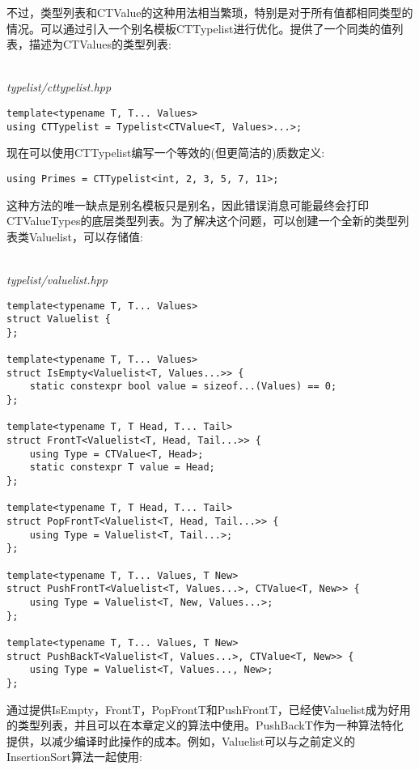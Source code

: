 不过，类型列表和CTValue的这种用法相当繁琐，特别是对于所有值都相同类型的情况。可以通过引入一个别名模板CTTypelist进行优化。提供了一个同类的值列表，描述为CTValues的类型列表:

\hspace*{\fill} \\ %
\noindent
\textit{typelist/cttypelist.hpp}
\begin{lstlisting}[style=styleCXX]
template<typename T, T... Values>
using CTTypelist = Typelist<CTValue<T, Values>...>;
\end{lstlisting}

现在可以使用CTTypelist编写一个等效的(但更简洁的)质数定义:

\begin{lstlisting}[style=styleCXX]
using Primes = CTTypelist<int, 2, 3, 5, 7, 11>;
\end{lstlisting}

这种方法的唯一缺点是别名模板只是别名，因此错误消息可能最终会打印CTValueTypes的底层类型列表。为了解决这个问题，可以创建一个全新的类型列表类Valuelist，可以存储值:

\hspace*{\fill} \\ %
\noindent
\textit{typelist/valuelist.hpp}
\begin{lstlisting}[style=styleCXX]
template<typename T, T... Values>
struct Valuelist {
};

template<typename T, T... Values>
struct IsEmpty<Valuelist<T, Values...>> {
	static constexpr bool value = sizeof...(Values) == 0;
};

template<typename T, T Head, T... Tail>
struct FrontT<Valuelist<T, Head, Tail...>> {
	using Type = CTValue<T, Head>;
	static constexpr T value = Head;
};

template<typename T, T Head, T... Tail>
struct PopFrontT<Valuelist<T, Head, Tail...>> {
	using Type = Valuelist<T, Tail...>;
};

template<typename T, T... Values, T New>
struct PushFrontT<Valuelist<T, Values...>, CTValue<T, New>> {
	using Type = Valuelist<T, New, Values...>;
};

template<typename T, T... Values, T New>
struct PushBackT<Valuelist<T, Values...>, CTValue<T, New>> {
	using Type = Valuelist<T, Values..., New>;
};
\end{lstlisting}

通过提供IsEmpty，FrontT，PopFrontT和PushFrontT，已经使Valuelist成为好用的类型列表，并且可以在本章定义的算法中使用。PushBackT作为一种算法特化提供，以减少编译时此操作的成本。例如，Valuelist可以与之前定义的InsertionSort算法一起使用:

